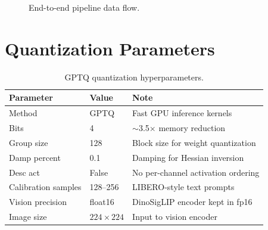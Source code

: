 \documentclass[11pt,a4paper]{article}
\begin{document}
\begin{figure}[h]
\caption{End-to-end pipeline data flow.}
\end{figure}

\section{Quantization Parameters}

\begin{table}[h]
\centering
\begin{tabular}{@{}lll@{}}
\toprule
\textbf{Parameter} & \textbf{Value} & \textbf{Note} \\
\midrule
Method           & GPTQ           & Fast GPU inference kernels \\
Bits             & 4              & $\sim$3.5$\times$ memory reduction \\
Group size       & 128            & Block size for weight quantization \\
Damp percent     & 0.1            & Damping for Hessian inversion \\
Desc act         & False          & No per-channel activation ordering \\
Calibration samples & 128--256    & LIBERO-style text prompts \\
Vision precision & float16        & DinoSigLIP encoder kept in fp16 \\
Image size       & $224\times224$ & Input to vision encoder \\
\bottomrule
\end{tabular}
\caption{GPTQ quantization hyperparameters.}
\end{table}

\end{document}
